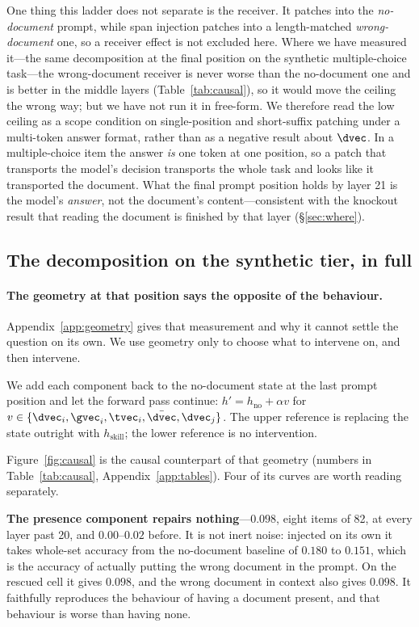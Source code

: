 One thing this ladder does not separate is the receiver. It patches into the
\emph{no-document} prompt, while span injection patches into a length-matched
\emph{wrong-document} one, so a receiver effect is not excluded here. Where we
have measured it---the same decomposition at the final position on the
synthetic multiple-choice task---the wrong-document receiver is never worse
than the no-document one and is better in the middle layers
(Table~\ref{tab:causal}), so it would move the ceiling the wrong way; but we
have not run it in free-form. We therefore read the low ceiling as a scope
condition on single-position and short-suffix patching under a multi-token
answer format, rather than as a negative result about $\dvec$. In a multiple-choice
item the answer \emph{is} one token at one position, so a patch that transports
the model's decision transports the whole task and looks like it transported the
document. What the final prompt position holds by layer 21 is the model's
\emph{answer}, not the document's content---consistent with the knockout result
that reading the document is finished by that layer (\S\ref{sec:where}).
\subsection{The decomposition on the synthetic tier, in full}
\label{app:decomp}

\paragraph{The geometry at that position says the opposite of the behaviour.}
Appendix~\ref{app:geometry} gives that measurement and why it cannot settle the
question on its own. We use geometry only to choose what to intervene on, and
then intervene.


We add each component back to the no-document state at the last prompt position
and let the forward pass continue: $h' = h_{\text{no}} + \alpha v$ for
$v \in \{\dvec_i, \gvec_i, \tvec_i, \bar{\dvec}, \dvec_j\}$. The upper reference
is replacing the state outright with $h_{\text{skill}}$; the lower reference is
no intervention.




Figure~\ref{fig:causal} is the causal counterpart of that geometry (numbers in
Table~\ref{tab:causal}, Appendix~\ref{app:tables}). Four of its curves are worth
reading separately.

\textbf{The presence component repairs nothing}---$0.098$, eight items of 82, at
every layer past 20, and $0.00$--$0.02$ before. It is not inert noise: injected
on its own it takes whole-set accuracy from the no-document baseline of $0.180$
to $0.151$, which is the accuracy of actually putting the wrong document in the
prompt. On the rescued cell it gives $0.098$, and the wrong document in context
also gives $0.098$. It faithfully reproduces the behaviour of having a document
present, and that behaviour is worse than having none.

